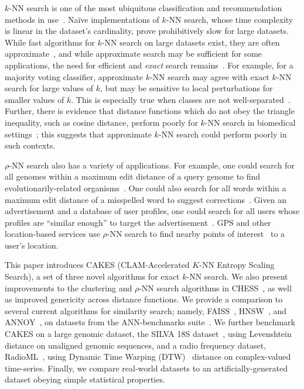$k$-NN search is one of the most ubiquitous classification and recommendation methods in use~\cite{fix1952discriminatory, cover1967nearest}.
Na\"{i}ve implementations of $k$-NN search, whose time complexity is linear in the dataset's cardinality, prove prohibitively slow for large datasets.
While fast algorithms for $k$-NN search on large datasets exist, they are often approximate~\cite{gao2023high}, and while approximate search may be sufficient for some applications, the need for efficient and \textit{exact} search remains~\cite{ukey2023survey}.
For example, for a majority voting classifier, approximate $k$-NN search may agree with exact $k$-NN search for large values of $k$, but may be sensitive to local perturbations for smaller values of $k$.
This is especially true when classes are not well-separated~\cite{zhang2022imbalanced}.
Further, there is evidence that distance functions which do not obey the triangle inequality, such as cosine distance, perform poorly for $k$-NN search in biomedical settings~\cite{hu2016distance};
this suggests that approximate $k$-NN search could perform poorly in such contexts.

$\rho$-NN search also has a variety of applications.
For example, one could search for all genomes within a maximum edit distance of a query genome to find evolutionarily-related organisms~\cite{budowski2010fragbag}.
One could also search for all words within a maximum edit distance of a misspelled word to suggest corrections~\cite{ukkonen1985algorithms}.
Given an advertisement and a database of user profiles, one could search for all users whose profiles are ``similar enough'' to target the advertisement~\cite{zhang2020privacy}.
GPS and other location-based services use $\rho$-NN search to find nearby points of interest~\cite{zhang2020privacy} to a user's location.

This paper introduces CAKES (CLAM-Accelerated $K$-NN Entropy Scaling Search), a set of three novel algorithms for exact $k$-NN search.
We also present improvements to the clustering and $\rho$-NN search algorithms in CHESS~\cite{ishaq2019clustered}, as well as improved genericity across distance functions.
We provide a comparison to several current algorithms for similarity search; namely, FAISS~\cite{johnson2019billion}, HNSW~\cite{malkov2016hnsw}, and ANNOY~\cite{annoy}, on datasets from the ANN-benchmarks suite~\cite{aumuller2020ann}.
We further benchmark CAKES on a large genomic dataset, the SILVA 18S dataset~\cite{10.1093/nar/gks1219}, using Levenshtein~\cite{levenshtein1966binary} distance on unaligned genomic sequences, and a radio frequency dataset, RadioML~\cite{oshea2018radioml}, using Dynamic Time Warping (DTW)~\cite{gold2018dynamic} distance on complex-valued time-series.
Finally, we compare real-world datasets to an artificially-generated dataset obeying simple statistical properties.



